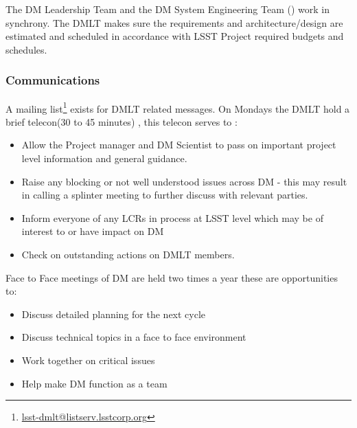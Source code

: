 The DM Leadership Team and the DM System Engineering Team () work in synchrony.
The DMLT makes sure the requirements and architecture/design are estimated and scheduled in accordance with LSST Project required budgets and schedules.

 \subsubsection{Communications}
 A mailing list\footnote{\url{lsst-dmlt@listserv.lsstcorp.org}} exists for DMLT related messages.
 On Mondays the DMLT hold a brief telecon(30 to 45 minutes) , this telecon serves to :
\begin{itemize}
\item Allow the Project manager and DM Scientist  to pass on important project level information and general guidance.
\item Raise any blocking or not well understood issues across DM - this may result in calling a splinter meeting to further discuss with relevant parties.
\item Inform everyone of any LCRs in process at LSST level which may be of interest to or  have impact on DM
\item Check on outstanding actions on DMLT members.
\end{itemize}

Face to Face meetings of DM are held two times a year these are opportunities to:
\begin{itemize}
\item Discuss detailed planning for the next cycle
\item Discuss technical topics in a face to face environment
\item Work together on critical issues
\item Help make DM function as a team
\end{itemize}

